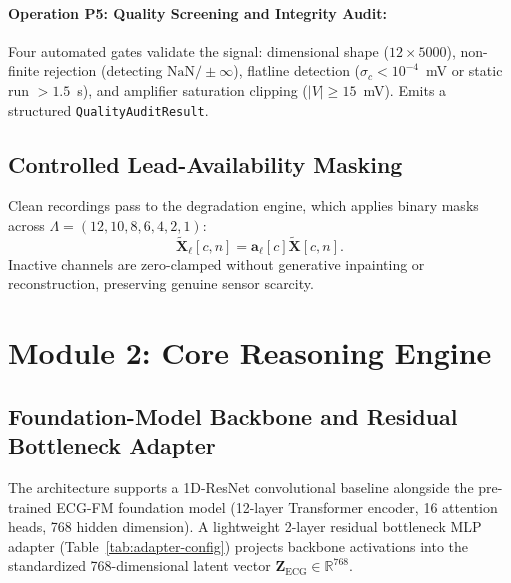\documentclass{ssnreview}
\begin{document}
\paragraph{Operation P5: Quality Screening and Integrity Audit:} Four automated gates validate
the signal: dimensional shape ($12 \times 5000$), non-finite rejection (detecting
$\mathrm{NaN}/\pm\infty$), flatline detection ($\sigma_c < 10^{-4}$~mV or static run $>1.5$~s),
and amplifier saturation clipping ($|V| \ge 15$~mV). Emits a structured \texttt{QualityAuditResult}.

\subsection{Controlled Lead-Availability Masking}

Clean recordings pass to the degradation engine, which applies binary masks across
$\Lambda = (12, 10, 8, 6, 4, 2, 1)$:
\begin{equation}
  \widetilde{\mathbf{X}}_\ell[c, n] = \mathbf{a}_\ell[c] \widetilde{\mathbf{X}}[c, n].
\end{equation}
Inactive channels are zero-clamped without generative inpainting or reconstruction, preserving
genuine sensor scarcity.

\section{Module 2: Core Reasoning Engine}

\subsection{Foundation-Model Backbone and Residual Bottleneck Adapter}

The architecture supports a 1D-ResNet convolutional baseline alongside the pre-trained ECG-FM
foundation model (12-layer Transformer encoder, 16 attention heads, 768 hidden dimension).
A lightweight 2-layer residual bottleneck MLP adapter (Table~\ref{tab:adapter-config}) projects
backbone activations into the standardized 768-dimensional latent vector
$\mathbf{Z}_{\mathrm{ECG}} \in \mathbb{R}^{768}$.
\end{document}
